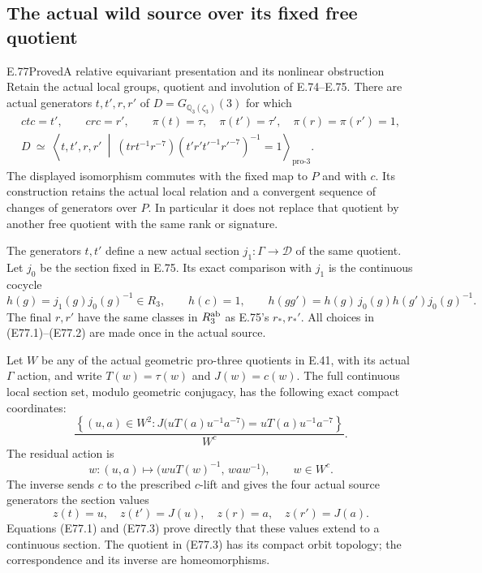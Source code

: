 \subsection{The actual wild source over its fixed free quotient}

\begin{statement}{E.77}{Proved}{A relative equivariant presentation and its nonlinear obstruction}
Retain the actual local groups, quotient and involution
of E.74--E.75. There are actual generators
$t,t',r,r'$ of $D=G_{\mathbb Q_3(\zeta_3)}(3)$ for which
\[
\begin{gathered}
 ct c=t',\qquad cr c=r',\qquad
 \pi(t)=\tau,\quad\pi(t')=\tau',\quad
 \pi(r)=\pi(r')=1,\\
 D\ \simeq\
 \left\langle t,t',r,r'\ \middle|\
 (trt^{-1}r^{-7})(t'r't'^{-1}r'^{-7})^{-1}=1
 \right\rangle_{\mathrm{pro}\text{-}3}.
\end{gathered}
 \tag{E77.1}
\]
The displayed isomorphism commutes with the fixed
map to $P$ and with $c$. Its construction retains
the actual local relation and a convergent sequence
of changes of generators over $P$.
In particular it does not replace that quotient by
another free quotient with the same rank or signature.

The generators $t,t'$ define a new actual section
$j_1:\Gamma\to\mathcal D$ of the same quotient.
Let $j_0$ be the section fixed in E.75. Its exact
comparison with $j_1$ is the continuous cocycle
\[
 h(g)=j_1(g)j_0(g)^{-1}\in R_3,\qquad
 h(c)=1,\qquad
 h(gg')=h(g)\,j_0(g)h(g')j_0(g)^{-1}.
 \tag{E77.2}
\]
The final $r,r'$ have the same classes in
$R_3^{\rm ab}$ as E.75's $r_*,r_*'$.
All choices in (E77.1)--(E77.2) are made once
in the actual source.

Let $W$ be any of the actual geometric pro-three
quotients in E.41, with its actual $\Gamma$ action,
and write $T(w)=\tau(w)$ and $J(w)=c(w)$.
The full continuous local section set, modulo
geometric conjugacy, has the following exact
compact coordinates:
\[
 \frac{\left\{(u,a)\in W^2:
          J\bigl(uT(a)u^{-1}a^{-7}\bigr)
             =uT(a)u^{-1}a^{-7}\right\}}{W^c}.
 \tag{E77.3}
\]
The residual action is
\[
 w:(u,a)\longmapsto
       \bigl(wuT(w)^{-1},\,waw^{-1}\bigr),
       \qquad w\in W^c.
 \tag{E77.4}
\]
The inverse sends $c$ to the prescribed $c$-lift
and gives the four actual source generators the
section values
\[
 z(t)=u,\quad z(t')=J(u),\quad
 z(r)=a,\quad z(r')=J(a).
 \tag{E77.5}
\]
Equations (E77.1) and (E77.3) prove directly that
these values extend to a continuous section.
The quotient in (E77.3) has its compact orbit
topology; the correspondence and its inverse
are homeomorphisms.


\end{statement}
